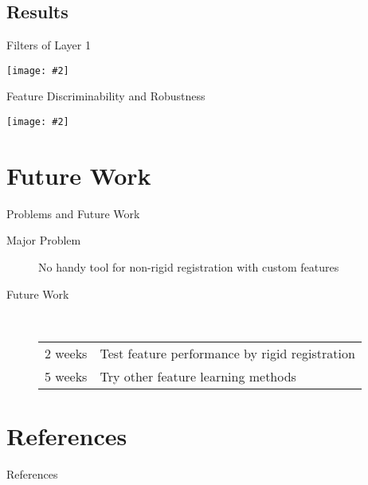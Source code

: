 \documentclass {beamer}
\newcommand{\addgraph}[2]{\begin{center}
\texttt{[image: \#2]}\end{center}}
\begin{document}
\subsection{Results}
\begin{frame}{Filters of Layer 1}
    \addgraph{0.6}{res/filter.png}
\end{frame}

\begin{frame}{Feature Discriminability and Robustness}
    \addgraph{0.7}{res/dist.png}
\end{frame}

\section{Future Work}
\begin{frame}{Problems and Future Work}
    \begin{description}
        \item[Major Problem] No handy tool for non-rigid registration with
            custom features
        \item[Future Work] \hspace{1em} \\
            \begin{tabular}{ll}
                2 weeks & Test feature performance by rigid registration \\
                5 weeks & Try other feature learning methods
            \end{tabular}
    \end{description}
\end{frame}


\section{ }
\subsection{ }

\section[]{References}
\begin{frame}[allowframebreaks]{References}
    \printbibliography
\end{frame}
\end{document}
